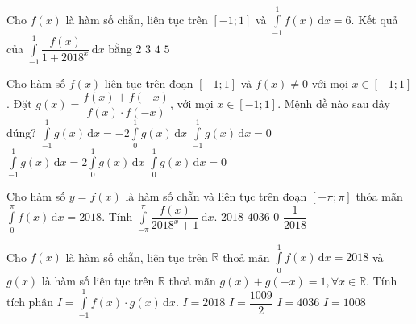 \begin{vd}%
	Cho $f(x)$ là hàm số chẵn, liên tục trên $[-1;1]$ và $\displaystyle \int \limits_{-1}^1 f(x) \mathrm{\,d}x = 6$. Kết quả của $\displaystyle \int \limits_{-1}^1 \dfrac{f(x)}{1+2018^x} \mathrm{\,d}x$ bằng
	\choice
	{$2$}
	{\True $3$}
	{$4$}
	{$5$}
\end{vd}
\begin{vd}%
Cho hàm số $f(x)$ liên tục trên đoạn $[-1;1]$ và $f(x) \neq 0$ với mọi $x \in [-1;1]$. Đặt $g(x) = \dfrac{f(x) + f(-x)}{f(x) \cdot f(-x)}$, với mọi $x \in [-1;1]$. Mệnh đề nào sau đây đúng?
\choice
{$\displaystyle\int\limits_{-1}^{1} g(x) \mathrm{\,d}x = -2\displaystyle\int\limits_{0}^{1} g(x) \mathrm{\,d}x$}
{$\displaystyle\int\limits_{-1}^{1} g(x) \mathrm{\,d}x =0$}
{\True $\displaystyle\int\limits_{-1}^{1} g(x) \mathrm{\,d}x = 2\displaystyle\int\limits_{0}^{1} g(x) \mathrm{\,d}x$}
{$\displaystyle\int\limits_{0}^{1} g(x) \mathrm{\,d}x =0$}
\end{vd}
\begin{vd}%
	Cho hàm số $y=f(x)$ là hàm số chẵn và liên tục trên đoạn $[-\pi;\pi]$ thỏa mãn $\displaystyle\int\limits_0^\pi f(x) \mathrm{\,d}x=2018$. Tính $\displaystyle\int\limits_{-\pi}^\pi \dfrac{f(x)}{2018^x+1} \mathrm{\,d}x$.
	\choice
	{\True $2018$}
	{$4036$}
	{$0$}
	{$\dfrac{1}{2018}$}
\end{vd}
\begin{vd}%
	Cho $f(x)$ là hàm số chẵn, liên tục trên $\mathbb{R}$ thoả mãn $\displaystyle\int\limits_{0}^{1} f(x) \mathrm{\,d}x=2018$ và $g(x)$ là hàm số liên tục trên $\mathbb{R}$ thoả mãn $g(x)+g(-x)=1,\forall x\in \mathbb{R}$. Tính tích phân $I=\displaystyle\int\limits_{-1}^{1}f(x)\cdot g(x) \mathrm{\,d}x$.
	\choice
	{\True $I=2018$}
	{$I=\dfrac{1009}{2}$}
	{$I=4036$}
	{$I=1008$}
\end{vd}

